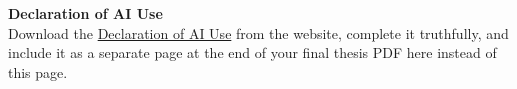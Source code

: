 \cleardoublepage
{}
\thispagestyle{empty}
\textbf{Declaration of AI Use}\\

Download the \href{https://www.ot.mgt.tum.de/fileadmin/w00cjr/log/Theses_ProjectStudies/Logscm_AI_Declaration.pdf}{Declaration of AI Use} from the website, complete it truthfully, and include it as a separate page at the end of your final thesis PDF here instead of this page.
